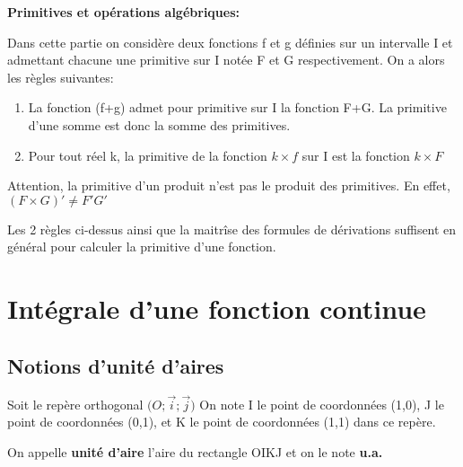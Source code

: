 \textbf{Primitives et opérations algébriques: }

Dans cette partie on considère deux fonctions f et g définies sur un
intervalle I et admettant chacune une primitive sur I notée F et G
respectivement. On a alors les règles suivantes:
\begin{enumerate}[label = (\arabic*), leftmargin = 2cm]
\item La fonction (f+g) admet pour primitive sur I la fonction F+G. La
  primitive d'une somme est donc la somme des primitives.
\item Pour tout réel k, la primitive de la fonction $k \times f$ sur I
  est la fonction $k \times F$
\end{enumerate}

\begin{Rem}
  Attention, la primitive d'un produit n'est pas le produit des
  primitives. En effet, $(F \times G)' \neq F' G'$
\end{Rem}

\note Les 2 règles ci-dessus ainsi que la maitrîse des formules de
dérivations suffisent en général pour calculer la primitive d'une
fonction. 

\section{Intégrale d'une fonction continue}
\subsection{Notions d'unité d'aires}

\begin{mydef}
  Soit le repère orthogonal $\Big( O; \vec{i}; \vec{j} \Big) $ On note
  I le point de coordonnées (1,0), J le point de coordonnées (0,1), et
  K le point de coordonnées (1,1) dans ce repère.
  
  On appelle \textbf{unité d'aire} l'aire du rectangle OIKJ et on le
  note \textbf{u.a.}
\end{mydef}

\exemple{}

